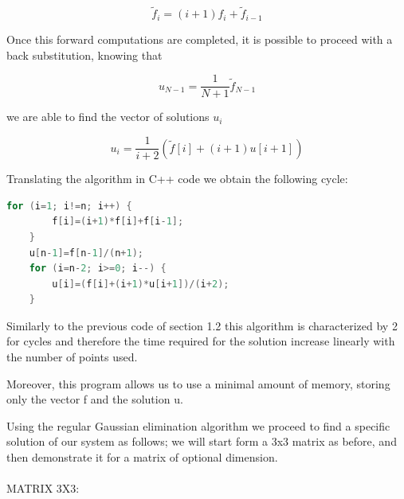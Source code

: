 \documentclass {article}
\begin{document}
$$\tilde{f}_i=(i+1)f_i+\tilde{f}_{i-1}$$

Once this forward computations are completed, it is possible to proceed with a back substitution, knowing that

$$u_{N-1}=\frac{1}{N+1} \tilde{f}_{N-1}$$

we are able to find the vector of solutions $u_i$

$$u_i=\frac{1}{i+2} (\tilde{f}[i]+ (i+1) u[i+1])$$

Translating the algorithm in C++ code we obtain the following cycle:

\begin{lstlisting}[language=cpp]
	for (i=1; i!=n; i++) {
		f[i]=(i+1)*f[i]+f[i-1];
	}
	u[n-1]=f[n-1]/(n+1);
	for (i=n-2; i>=0; i--) {
		u[i]=(f[i]+(i+1)*u[i+1])/(i+2);
	}
\end{lstlisting}

Similarly to the previous code of section 1.2 this algorithm is characterized by 2 for cycles and therefore the time required for the solution increase linearly with the number of points used.

Moreover, this program allows us to use a minimal amount of memory, storing only the vector f and the solution u. 


Using the regular Gaussian elimination algorithm we proceed to find a specific solution of our system as follows; we will start form a 3x3 matrix as before, and then demonstrate it for a matrix of optional dimension.
\\
\\
MATRIX 3X3:
\end{document}
